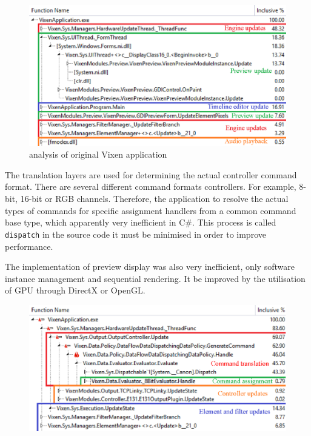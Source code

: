\begin{figure}[!t]
  \centering
  \includegraphics[width=0.85\columnwidth]{Figs/vixen_perf_original_overview.eps}
  \caption{\footnotesize {} analysis of original Vixen application}
  \label{fig:vixen_perf_original_overview}
\end{figure}

The translation layers are used for determining the actual controller command format. There are several different command formats  controllers. For example, 8-bit, 16-bit or RGB channels. Therefore, the application  to resolve the actual types of commands for specific assignment handlers from a common command base type, which  apparently very inefficient in C\#. This process is called \texttt{dispatch} in the source code\ca{;} it must be minimised in order to improve performance.

The implementation of  preview display was also very inefficient,  only software instance management and sequential rendering. It  be improved by the utilisation of GPU through DirectX or OpenGL.


\begin{figure}[!t]
  \centering
  \includegraphics[width=0.85\columnwidth]{Figs/vixen_perf_original_scheduler.eps}
  \caption{\footnotesize {}}
  \label{fig:vixen_perf_original_scheduler}
\end{figure}

